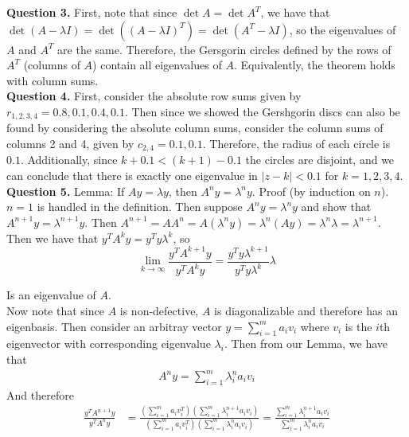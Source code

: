 \documentclass{article}
\newcommand{\ra}{\longrightarrow}
\begin{document}

\textbf{Question 3.} First, note that since $\det A = \det A^T$, we have that $\det(A - \lambda I) = \det((A-\lambda I)^T) = \det(A^T - \lambda I)$, so the eigenvalues of $A$ and $A^T$ are the same. Therefore, the Gersgorin circles defined by the rows of $A^T$ (columns of $A$) contain all eigenvalues of $A$. Equivalently, the theorem holds with column sums.\\

\textbf{Question 4.} First, consider the absolute row sums given by $r_{1,2,3,4} = 0.8, 0.1, 0.4, 0.1$. Then since we showed the Gershgorin discs can also be found by considering the absolute column sums, consider the column sums of columns 2 and 4, given by $c_{2,4} = 0.1, 0.1$. Therefore, the radius of each circle is $0.1$. Additionally, since $k+0.1<(k+1)-0.1$ the circles are disjoint, and we can conclude that there is exactly one eigenvalue in $|z-k| < 0.1$ for $k=1,2,3,4$. \\

\textbf{Question 5.} Lemma: If $Ay = \lambda y $, then $A^n y = \lambda^n y$. Proof (by induction on $n$). $n=1$ is handled in the definition. Then suppose $A^n y = \lambda^n y$ and show that $A^{n+1}y= \lambda^{n+1}y$. Then $A^{n+1}=AA^n = A(\lambda^n y) = \lambda^n (Ay) = \lambda^n \lambda = \lambda^{n+1}$. Then we have that $y^T A^k y = y^T y\lambda^k$, so 
\begin{equation*}
    \lim_{k \ra \infty} \frac{y^T A^{k+1}y}{y^T A^k y} = \frac{y^T y \lambda^{k+1}}{y^T y \lambda^k} \lambda 
\end{equation*}

Is an eigenvalue of $A$. \\

Now note that since $A$ is non-defective, $A$ is diagonalizable and therefore has an eigenbasis. Then consider an arbitray vector $y =\sum_{i=1}^m a_i v_i$ where $v_i$ is the $i$th eigenvector with corresponding eigenvalue $\lambda_i$. Then from our Lemma, we have that 
\begin{align*}
    A^n y = \sum_{i=1}^m \lambda_i^na_i v_i
\end{align*}
And therefore 
\begin{align*}
    \frac{y^T A^{n+1}y}{y^TA^n y} &= \frac{(\sum_{i=1}^m a_iv_i^T)(\sum_{i=1}^m \lambda_i^{n+1}a_i v_i)}{(\sum_{i=1}^m a_iv_i^T)(\sum_{i=1}^m \lambda_i^{n}a_i v_i)} = \frac{\sum_{i=1}^m \lambda_i^{n+1}a_i v_i}{\sum_{i=1}^m \lambda_i^{n}a_i v_i}
\end{align*}
\end{document}
